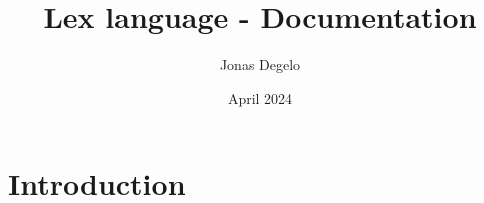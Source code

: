 \documentclass{article}
\title{Lex language - Documentation}
\author{Jonas Degelo}
\date{April 2024}
\begin{document}
\maketitle

\section{Introduction}
\end{document}
